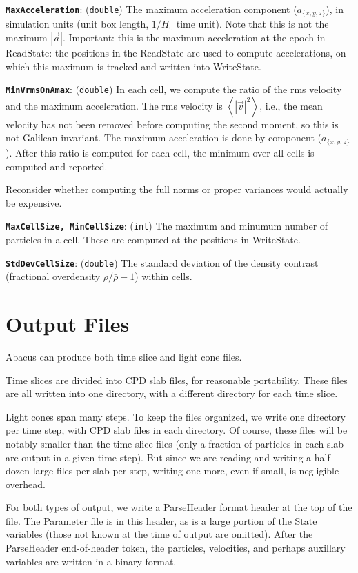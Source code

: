 \documentclass[11pt,preprint]{aastex}
\newcommand{\param}[2]{\medskip\noindent\textbf{\texttt{#1}}: ({\tt #2}) }
\newcommand{\todo}{}
\newcommand{\todo}[1]{{\bf TODO: #1}}
\begin{document}
\param{MaxAcceleration}{double} The maximum acceleration component
($a_{\{x,y,z\}}$), in simulation units (unit box length, $1/H_0$
time unit).  Note that this is not the maximum $|\vec{a}|$.  Important:
this is the maximum acceleration at the epoch in ReadState: the
positions in the ReadState are used to compute accelerations, on
which this maximum is tracked and written into WriteState.

\param{MinVrmsOnAmax}{double}
In each cell, we compute the ratio of the rms velocity and the
maximum acceleration.  The rms velocity is $\left<|\vec{v}|^2\right>$,
i.e., the mean velocity has not been removed before computing the
second moment, so this is not Galilean invariant.  The maximum
acceleration is done by component ($a_{\{x,y,z\}}$).  After this
ratio is computed for each cell, the minimum over all cells is
computed and reported.

\todo{Reconsider whether computing the full norms or proper variances 
would actually be expensive.}

\param{MaxCellSize, MinCellSize}{int} The maximum and minumum number
of particles in a cell.  These are computed at the positions in
WriteState.

\param{StdDevCellSize}{double} The standard deviation of the density contrast (fractional overdensity $\rho/\bar\rho - 1$) within cells.


\clearpage
\section{Output Files}

Abacus can produce both time slice and light cone files.  

Time slices are divided into CPD slab files, for reasonable
portability.  These files are all written into one directory, with
a different directory for each time slice.

Light cones span many steps.  To keep the files organized, we write
one directory per time step, with CPD slab files in each directory.
Of course, these files will be notably smaller than the time slice
files (only a fraction of particles in each slab are output in a
given time step).  But since we are reading and writing a half-dozen
large files per slab per step, writing one more, even if small, is
negligible overhead.

For both types of output, we write a ParseHeader format header at
the top of the file.  The Parameter file is in this header, as is
a large portion of the State variables (those not known at the time
of output are omitted).  After the ParseHeader end-of-header token,
the particles, velocities, and perhaps auxillary variables are written
in a binary format.
\end{document}
